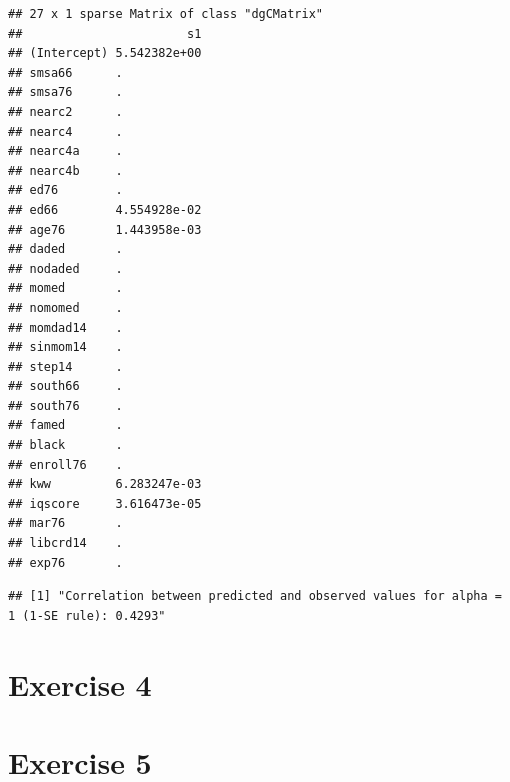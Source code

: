 \documentclass[
]{article}
\begin{document}
\begin{verbatim}
## 27 x 1 sparse Matrix of class "dgCMatrix"
##                       s1
## (Intercept) 5.542382e+00
## smsa66      .           
## smsa76      .           
## nearc2      .           
## nearc4      .           
## nearc4a     .           
## nearc4b     .           
## ed76        .           
## ed66        4.554928e-02
## age76       1.443958e-03
## daded       .           
## nodaded     .           
## momed       .           
## nomomed     .           
## momdad14    .           
## sinmom14    .           
## step14      .           
## south66     .           
## south76     .           
## famed       .           
## black       .           
## enroll76    .           
## kww         6.283247e-03
## iqscore     3.616473e-05
## mar76       .           
## libcrd14    .           
## exp76       .
\end{verbatim}

\begin{verbatim}
## [1] "Correlation between predicted and observed values for alpha = 1 (1-SE rule): 0.4293"
\end{verbatim}

\hypertarget{exercise-4}{%
\section{Exercise 4}\label{exercise-4}}

\hypertarget{exercise-5}{%
\section{Exercise 5}\label{exercise-5}}
\end{document}
